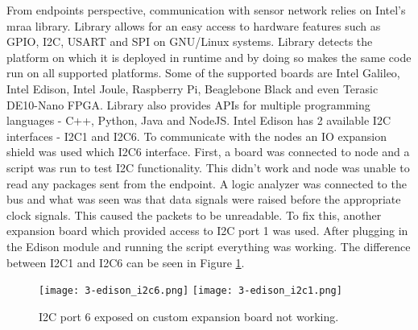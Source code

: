 From endpoints perspective, communication with sensor network relies on Intel's mraa library\cite{mraa}. Library allows for an easy access to hardware features such as \ac{GPIO}, \ac{I2C}, \ac{USART} and \ac{SPI} on GNU/Linux systems. Library detects the platform on which it is deployed in runtime and by doing so makes the same code run on all supported platforms. Some of the supported boards are Intel Galileo, Intel Edison, Intel Joule, Raspberry Pi, Beaglebone Black and even Terasic DE10-Nano \ac{FPGA}. Library also provides \ac{API}s for multiple programming languages - C++, Python, Java and NodeJS. Intel Edison has 2 available I2C interfaces - I2C1 and I2C6. To communicate with the nodes an IO expansion shield was used which \ac{I2C}6 interface\cite{ioexpansion}. First, a board was connected to node and a script was run to test \ac{I2C} functionality. This didn't work and node was unable to read any packages sent from the endpoint. A logic analyzer was connected to the bus and what was seen was that data signals were raised before the appropriate clock signals. This caused the packets to be unreadable. To fix this, another expansion board which provided access to I2C port 1 was used. After plugging in the Edison module and running the script everything was working. The difference between I2C1 and I2C6 can be seen in Figure \ref{fig:endpoint_i2c16}.

\begin{figure}[h]
  \begin{center}
    \texttt{[image: 3-edison\_i2c6.png]}
    \texttt{[image: 3-edison\_i2c1.png]}
  \end{center}
  \caption{I2C port 6 exposed on custom expansion board not working.}
  \label{fig:endpoint_i2c16}
\end{figure}

